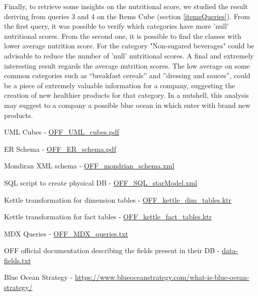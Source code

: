 \documentclass[runningheads]{llncs}
\begin{document}
Finally, to retrieve some insights on the nutritional score, we studied the result deriving from queries 3 and 4 on the Items Cube (section \ref{itemsQueries}). From the first query, it was possible to verify which categories have more 'null' nutritional scores. From the second one, it is possible to find the classes with lower average nutrition score. For the category "Non-sugared beverages" could be advisable to reduce the number of 'null' nutritional scores. A final and extremely interesting result regards the average nutrition scores. The low average on some common categories such as “breakfast cereals” and ”dressing and sauces”, could be a piece of extremely valuable information for a company, suggesting the creation of new healthier products for that category. In a nutshell, this analysis may suggest to a company a possible blue ocean \cite{Blue_ocean} in which enter with brand new products.


\begin{thebibliography}{8}

UML Cubes - \href{https://drive.google.com/file/d/1OXqoUHYORNAeoYiIW48qWie1biFImclk/view?usp=sharing}{OFF\_UML\_cubes.pdf}

ER Schema - \href{https://drive.google.com/file/d/1Tj3Ff4SW5SalN-cHz-3SFPpiQvsAFUIA/view?usp=sharing}{OFF\_ER\_schema.pdf}

Mondiran XML schema - \href{https://drive.google.com/file/d/1lJUrINv4cD8bpt_rbguRNqbTZdhZK1_4/view?usp=sharing}{OFF\_mondrian\_schema.xml}

SQL script to create physical DB - \href{https://drive.google.com/file/d/1eCghbQvV1YWos_ByLT7d3WKadAA7giW8/view?usp=sharing}{OFF\_SQL\_starModel.xml}

Kettle transformation for dimension tables - \href{https://drive.google.com/file/d/1stRD6mkiLHVMmi2wZulkbTej-Y6_Wq3c/view?usp=sharing}{OFF\_kettle\_dim\_tables.ktr}

Kettle transformation for fact tables - \href{https://drive.google.com/file/d/1s3R28N6qIgJcUsU-3oShPSO7XPx0O5RP/view?usp=sharing}{OFF\_kettle\_fact\_tables.ktr}

MDX Queries - \href{https://drive.google.com/file/d/1e_XURkhomOWtEVxNgomQYiRQHYzmzRSi/view?usp=sharing}{OFF\_MDX\_queries.txt}

OFF official documentation describing the fields present in their DB - \href{https://static.openfoodfacts.org/data/data-fields.txt}{data-fields.txt}

Blue Ocean Strategy - \url{https://www.blueoceanstrategy.com/what-is-blue-ocean-strategy/}

\end{thebibliography}

%
%
%
\end{document}
